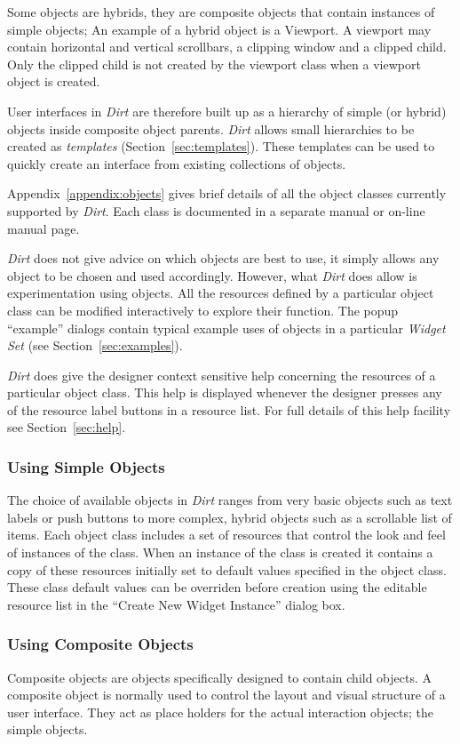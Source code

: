 Some objects are hybrids, they are composite objects
that contain instances of simple objects;
An example of a hybrid object is a Viewport.  A viewport may contain
horizontal and vertical scrollbars, a clipping window and a clipped child.
Only the clipped child is not created by the viewport class when a viewport
object is created.

User interfaces in {\em Dirt} are therefore built up as a hierarchy of simple
(or hybrid) objects inside composite object parents.  {\em Dirt} allows small
hierarchies to be created as {\em templates} (Section~\ref{sec:templates}).
These templates can be used to quickly create an interface from existing
collections of objects.

Appendix~\ref{appendix:objects} gives brief details of all the object classes
currently supported by {\em Dirt}.  Each class is documented in a
separate manual or on-line manual page.

{\em Dirt} does not give advice on which objects are best to use, it simply
allows any object to be chosen and used accordingly. However, what
{\em Dirt} does allow is experimentation using objects.  All the
resources defined by a particular object class can be modified interactively
to explore their function.  The popup ``example'' dialogs contain typical
example uses of objects in a particular {\em Widget Set} (see
Section~\ref{sec:examples}).

{\em Dirt} does give the designer context sensitive help concerning
the resources of a
particular object class.  This help is displayed whenever the designer
presses any of the resource label buttons in a resource list.
For full details of this help facility see Section~\ref{sec:help}.

\subsubsection{Using Simple Objects}
The choice of available objects in {\em Dirt} ranges from very basic objects
such as text labels or push buttons to more complex, hybrid objects such
as a scrollable list of items.  Each object class includes a set of resources
that control the look and feel of instances of the class.  When an instance
of the class is created it contains a copy of these resources initially set
to default values specified in the object class. These class default
values can be overriden before creation using the editable resource list
in the ``Create New Widget Instance'' dialog box.

\subsubsection{Using Composite Objects}
\label{sec:geometry-management}
Composite objects are objects specifically designed to contain child
objects.  A composite object is normally used to control the layout and
visual structure of a user interface.  They act as place holders for the
actual interaction objects; the simple objects.

